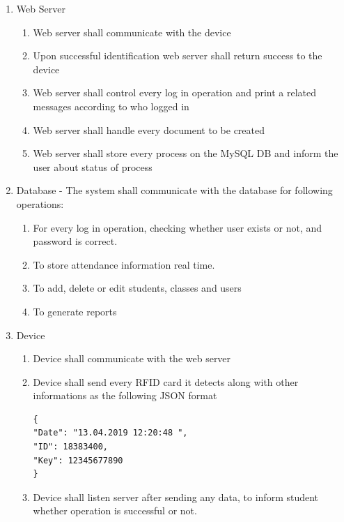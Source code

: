 \documentclass{scrreprt}
\begin{document}
\begin{enumerate}[leftmargin=5\parindent, label=SI-\arabic*:]
   \item Web Server
   	\begin{enumerate}[leftmargin=2\parindent, label=SI-1.\arabic*:]
	 	\item Web server shall communicate with the device
		\item Upon successful identification web server shall return success to the device
		\item Web server shall control every log in operation and print a related messages according to who logged in
		\item Web server shall handle every document to be created
		\item Web server shall store every process on the MySQL DB and inform the user about status of process
	\end{enumerate}
    \item Database - The system shall communicate with the database for following operations:
   	\begin{enumerate}[leftmargin=2\parindent, label=SI-2.\arabic*:]
	 	\item For every log in operation, checking whether user exists or not, and password is correct.
		\item To store attendance information real time.
		\item To add, delete or edit students, classes and users
		\item To generate reports
	\end{enumerate}
     \item Device
   	\begin{enumerate}[leftmargin=2\parindent, label=SI-3.\arabic*:]
	 	\item Device shall communicate with the web server
		\item Device shall send every RFID card it detects along with other informations as the following JSON format
			
			\begin{lstlisting}[frame=tlrb]
{
"Date": "13.04.2019 12:20:48 ",
"ID": 18383400,
"Key": 12345677890
}
			\end{lstlisting}
		\item Device shall listen server after sending any data, to inform student whether operation is successful or not.
	\end{enumerate}
\end{enumerate}
\end{document}
